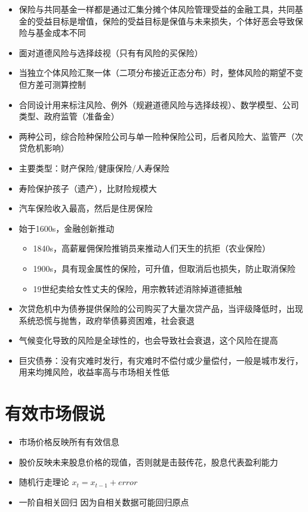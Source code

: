 \documentclass[]{book}
\providecommand{\tightlist}{%
  \setlength{\itemsep}{0pt}\setlength{\parskip}{0pt}}
\begin{document}
\begin{itemize}
\tightlist
\item
  保险与共同基金一样都是通过汇集分摊个体风险管理受益的金融工具，共同基金的受益目标是增值，保险的受益目标是保值与未来损失，个体好恶会导致保险与基金成本不同
\item
  面对道德风险与选择歧视（只有有风险的买保险）
\item
  当独立个体风险汇聚一体（二项分布接近正态分布）时，整体风险的期望不变但方差可测算控制
\item
  合同设计用来标注风险、例外（规避道德风险与选择歧视）、数学模型、公司类型、政府监管（准备金）
\item
  两种公司，综合险种保险公司与单一险种保险公司，后者风险大、监管严（次贷危机影响）
\item
  主要类型：财产保险/健康保险/人寿保险
\item
  寿险保护孩子（遗产），比财险规模大
\item
  汽车保险收入最高，然后是住房保险
\item
  始于1600s，金融创新推动

  \begin{itemize}
  \tightlist
  \item
    1840s，高薪雇佣保险推销员来推动人们天生的抗拒（农业保险）
  \item
    1900s，具有现金属性的保险，可升值，但取消后也损失，防止取消保险
  \item
    19世纪卖给女性丈夫的保险，用宗教转述消除掉道德抵触
  \end{itemize}
\item
  次贷危机中为债券提供保险的公司购买了大量次贷产品，当评级降低时，出现系统恐慌与抛售，政府举债募资困难，社会衰退
\item
  气候变化导致的风险是全球性的，也会导致社会衰退，这个风险在提高
\item
  巨灾债券：没有灾难时发行，有灾难时不偿付或少量偿付，一般是城市发行，用来均摊风险，收益率高与市场相关性低
\end{itemize}

\section{有效市场假说}

\begin{itemize}
\tightlist
\item
  市场价格反映所有有效信息
\item
  股价反映未来股息价格的现值，否则就是击鼓传花，股息代表盈利能力
\item
  随机行走理论 \(x_t = x_{t-1}+error\)
\item
  一阶自相关回归 因为自相关数据可能回归原点
\end{itemize}
\end{document}

